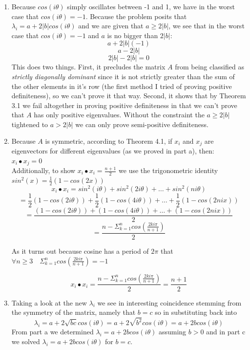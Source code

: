 \documentclass[11pt,a4paper]{article}
\begin{document}
\begin{itemize}
\begin{enumerate} [label={\alph*)}]
\begin{enumerate}
					\end{enumerate}
					\item Because $cos(i\theta)$ simply oscillates between -1 and 1, we have in the worst case that $cos(i\theta)=-1$. Because the problem posits that $\lambda_i=a+2\vert b \vert cos(i\theta)$ and we are given that $a\geq 2\vert b \vert$, we see that in the worst case that $cos(i\theta) = -1$ and $a$ is no bigger than $2\vert b \vert$:
					$$a + 2\vert b \vert (-1)$$
					$$a-2\vert b \vert$$
					$$2\vert b \vert-2\vert b \vert = 0 $$
					This does two things. First, it precludes the matrix $A$ from being classified as \textit{strictly diagonally dominant} since it is not strictly greater than the sum of the other elements in it's row (the first method I tried of proving positive definiteness), so we can't prove it that way. Second, it shows that by Theorem 3.1 we fail altogether in proving positive definiteness in that we can't prove that $A$ has only positive eigenvalues. Without the constraint the $a \geq 2\vert b \vert$ tightened to $a > 2\vert b \vert$ we can only prove semi-positive definiteness.
					\item Because $A$ is symmetric, according to Theorem 4.1, if $x_i$ and $x_j$ are eigenvectors for different eigenvalues (as we proved in part a), then: $x_i \bullet x_j = 0$\\
					Additionally, to show $x_i \bullet x_i = \frac{n+1}{2}$ we use the trigonometric identity $sin^2(x) = \frac{1}{2}(1- cos(2x))$
					$$ x_i \bullet x_i = sin^2(i\theta)+sin^2(2i\theta)+\dots + sin^2(ni\theta)$$
					$$= \frac{1}{2}(1- cos(2i\theta))+\frac{1}{2}(1- cos(4i\theta))+\dots + \frac{1}{2}(1- cos(2nix))$$
					$$= \frac{(1- cos(2i\theta))+(1- cos(4i\theta))+\dots + (1- cos(2nix))}{2}$$
					$$= \frac{n - \Sigma_{k=1}^n cos(\frac{2ki\pi}{n+1})}{2}$$
					\begin{center}
						As it turns out because cosine has a period of $2\pi$ that $\forall n \geq 3 \quad \Sigma_{k=1}^n cos(\frac{2ki\pi}{n+1}) = -1$
					\end{center}
					$$ x_i \bullet x_i = \frac{n - \Sigma_{k=1}^n cos(\frac{2ki\pi}{n+1})}{2} = \frac{n+1}{2}$$
					\item Taking a look at the new $\lambda_i$ we see in interesting coincidence stemming from the symmetry of the matrix, namely that $b=c$ so in substituting back into $$\lambda_i = a+2\sqrt{bc}cos(i\theta) = a + 2\sqrt{b^2}cos(i\theta) = a + 2bcos(i\theta)$$ From part a we determined $\lambda_i = a + 2bcos(i\theta)$ assuming $b > 0$ and in part c we solved $\lambda_i = a + 2bcos(i\theta)$ for $b=c$.\\

\end{enumerate}
\end{itemize}
\end{document}
